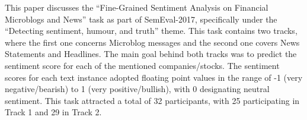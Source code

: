 This paper discusses the ``Fine-Grained Sentiment Analysis on Financial Microblogs and News'' task as part of SemEval-2017, specifically under the ``Detecting sentiment, humour, and truth'' theme. This task contains two tracks, where the first one concerns Microblog messages and the second one covers News Statements and Headlines. The main goal behind both tracks was to predict the sentiment score for each of the mentioned companies/stocks. The sentiment scores for each text instance adopted floating point values in the range of -1 (very negative/bearish) to 1 (very positive/bullish), with 0 designating neutral sentiment. This task attracted a total of 32 participants, with 25 participating in Track 1 and 29 in Track 2.
